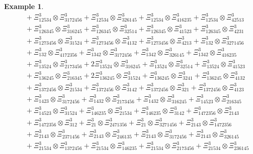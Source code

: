 \documentclass{amsart}
\theoremstyle{definition}
\newtheorem{example}[lemma]{Example}
\theoremstyle{remark}
\numberwithin{equation}{subsection}
\begin{document}
\begin{example}
\begin{align*}
&\quad + \Xi_{12534}^{3} \otimes \Xi_{3172456}^{3} + \Xi_{12534}^{3} \otimes \Xi_{326145}^{3} + \Xi_{12534}^{3} \otimes \Xi_{416235}^{3} + \Xi_{12534}^{3} \otimes \Xi_{42513}^{3} \\
&\quad + \Xi_{126345}^{3} \otimes \Xi_{316245}^{3} + \Xi_{126345}^{3} \otimes \Xi_{32514}^{3} + \Xi_{126345}^{3} \otimes \Xi_{41523}^{3} + \Xi_{126345}^{3} \otimes \Xi_{4231}^{3} \\
&\quad + \Xi_{1273456}^{3} \otimes \Xi_{31524}^{3} + \Xi_{1273456}^{3} \otimes \Xi_{4132}^{3} + \Xi_{1273456}^{3} \otimes \Xi_{4213}^{3} + \Xi_{132}^{3} \otimes \Xi_{3271456}^{3} \\
&\quad + \Xi_{132}^{3} \otimes \Xi_{4172356}^{3} + \Xi_{1342}^{3} \otimes \Xi_{3172456}^{3} + \Xi_{1342}^{3} \otimes \Xi_{326145}^{3} + \Xi_{1342}^{3} \otimes \Xi_{416235}^{3} \\
&\quad + \Xi_{13524}^{3} \otimes \Xi_{2173456}^{3} + 2 \Xi_{13524}^{3} \otimes \Xi_{316245}^{3} + \Xi_{13524}^{3} \otimes \Xi_{32514}^{3} + \Xi_{13524}^{3} \otimes \Xi_{41523}^{3} \\
&\quad + \Xi_{136245}^{3} \otimes \Xi_{216345}^{3} + 2 \Xi_{136245}^{3} \otimes \Xi_{31524}^{3} + \Xi_{136245}^{3} \otimes \Xi_{3241}^{3} + \Xi_{136245}^{3} \otimes \Xi_{4132}^{3} \\
&\quad + \Xi_{1372456}^{3} \otimes \Xi_{21534}^{3} + \Xi_{1372456}^{3} \otimes \Xi_{3142}^{3} + \Xi_{1372456}^{3} \otimes \Xi_{321}^{3} + \Xi_{1372456}^{3} \otimes \Xi_{4123}^{3} \\
&\quad + \Xi_{1423}^{3} \otimes \Xi_{3172456}^{3} + \Xi_{1432}^{3} \otimes \Xi_{2173456}^{3} + \Xi_{1432}^{3} \otimes \Xi_{316245}^{3} + \Xi_{14523}^{3} \otimes \Xi_{216345}^{3} \\
&\quad + \Xi_{14523}^{3} \otimes \Xi_{31524}^{3} + \Xi_{146235}^{3} \otimes \Xi_{21534}^{3} + \Xi_{146235}^{3} \otimes \Xi_{3142}^{3} + \Xi_{1472356}^{3} \otimes \Xi_{2143}^{3} \\
&\quad + \Xi_{1472356}^{3} \otimes \Xi_{312}^{3} + \Xi_{21}^{3} \otimes \Xi_{2471356}^{3} + \Xi_{21}^{3} \otimes \Xi_{3271456}^{3} + \Xi_{2143}^{3} \otimes \Xi_{1472356}^{3} \\
&\quad + \Xi_{2143}^{3} \otimes \Xi_{2371456}^{3} + \Xi_{2143}^{3} \otimes \Xi_{246135}^{3} + \Xi_{2143}^{3} \otimes \Xi_{3172456}^{3} + \Xi_{2143}^{3} \otimes \Xi_{326145}^{3} \\
&\quad + \Xi_{21534}^{3} \otimes \Xi_{1372456}^{3} + \Xi_{21534}^{3} \otimes \Xi_{146235}^{3} + \Xi_{21534}^{3} \otimes \Xi_{2173456}^{3} + \Xi_{21534}^{3} \otimes \Xi_{236145}^{3} \\

\end{align*}
\end{example}
\end{document}
